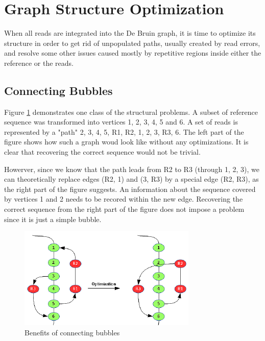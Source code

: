 \section{Graph Structure Optimization}
\label{sec:graph-structure-optimization}

When all reads are integrated into the De Bruin graph, it is time to optimize its structure in order to get rid of unpopulated paths, usually created by read errors, and resolve some other issues caused mostly by repetitive regions inside either the reference or the reads.

\subsection{Connecting Bubbles}
\label{subsec:connecting-bubbles}

Figure \ref{fig:bubble-connection} demonstrates one class of the structural problems. A subset of reference sequence was transformed into vertices 1, 2, 3, 4, 5 and 6. A set of reads is represented by a "path" 2, 3, 4, 5, R1, R2, 1, 2, 3, R3, 6.  The left part of the figure shows how such a graph woud look like without any optimizations. It is clear that recovering the correct sequence would not be trivial. 

Howerver, since we know that the path leads from R2 to R3 (through 1, 2, 3), we can theoretically replace edges (R2, 1) and (3, R3) by a special edge (R2, R3), as the right part of the figure suggests. An information about the sequence covered by vertices 1 and 2 needs to be recored within the new edge. Recovering the correct sequence from the right part of the figure does not impose a problem since it is just a simple bubble. 

\begin{figure}
	\centering
	\includegraphics{img/bubble-connection.pdf}
	\caption{Benefits of connecting bubbles}
	\label{fig:bubble-connection}
\end{figure}

